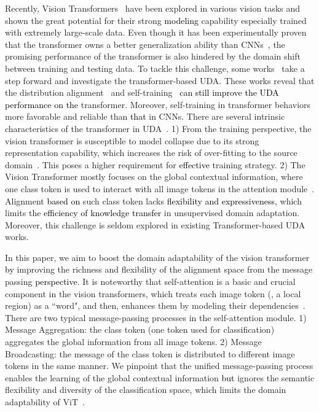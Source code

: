 \documentclass[journal]{IEEEtran}
\newcommand{\tcb}{\textcolor{black}}
\newcommand{\tco}{\textcolor{black}}
\begin{document}
Recently, Vision Transformers~\cite{dosovitskiy2020imageViT,liu2021Swin,chu2021twinsTwins,wang2021pyramidPVT,xu2022groupvit,zhu2020deformable,cheng2022masked,li2022hst,liu2022swiniqa,lu2022rtn} have been explored in various vision tasks and shown the great potential for their strong \tcb{modeling} capability especially trained with extremely large-scale data. 
Even though it has been experimentally proven that the transformer owns a better generalization ability than CNNs~\cite{xu2021cdtransCDTrans,zhang2022GE-ViTs}, the promising performance of the transformer is also hindered by the domain shift between training and testing data. To tackle this challenge, some works~\cite{yang2021tvtTVT, zhang2022delvingGE-ViTs, sun2022safeSSRT, hoyer2022daformerDAformer} take a step forward and investigate the transformer-based UDA. These works reveal that the distribution alignment~\cite{sun2022safeSSRT,yang2021tvtTVT} and self-training~\cite{xu2021cdtransCDTrans,wang2022domainBCAT} \tcb{can still improve the UDA performance on the} transformer. 
Moreover, self-training in transformer behaviors more favorable and reliable 
than \tcb{that} in CNNs. There are several intrinsic characteristics of the transformer in UDA~\cite{zhang2022GE-ViTs,sun2022safeSSRT,hoyer2022daformerDAformer,xu2021cdtransCDTrans}. 1) From the training perspective, the vision transformer is susceptible to model collapse due to its strong representation capability, which increases the risk of over-fitting to the source domain~\cite{zhang2022GE-ViTs}. This poses a higher requirement for \tco{effective} training strategy. 2) The Vision Transformer mostly focuses on the global contextual information, where one class token is used to interact with all image tokens in the attention module~\tcb{\cite{dosovitskiy2020imageViT}}.
Alignment \tcb{based on} such class token lacks \tcb{flexibility and expressiveness}, which limits the \tcb{efficiency of knowledge transfer} in unsupervised domain adaptation. Moreover, this challenge is seldom explored in existing Transformer-based UDA works.


In this paper, we aim to boost the domain adaptability of the vision transformer \tcb{by} improving the richness and flexibility of the alignment space from the message passing \tcb{perspective}.
It is noteworthy that self-attention is a basic and crucial component in the vision transformers, which treats each image token (\ieno, a local region) as a ``word", and then, enhances them by modeling their dependencies~\cite{vaswani2017attentionisallyouneed,dosovitskiy2020imageViT}. There are two typical message-passing processes in the self-attention module. 1) Message Aggregation: the class token (one token used for classification) aggregates the global information from all image tokens. 
 2) Message Broadcasting: the message of the class token is distributed to different image tokens in the same manner.
We pinpoint that the unified message-passing process enables the learning of the global contextual information \tcb{but} ignores the semantic flexibility and diversity of the classification space, which limits the domain adaptability of ViT~\cite{dosovitskiy2020imageViT}.
\end{document}
